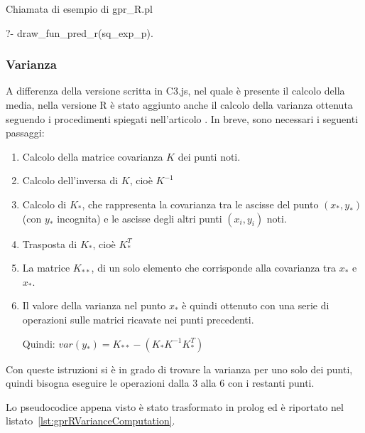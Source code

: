 \documentclass[10pt,titlepage,twoside,a4paper]{report}
\newenvironment{code}{\singlespacing\captionsetup{type=listing}}{}
\begin{document}
\begin{code}
\caption{Chiamata di esempio di gpr\_R.pl}
\label{lst:gprRExample}
\begin{prologcode*}{}
?- draw_fun_pred_r(sq_exp_p).
\end{prologcode*}
\end{code}

\subsubsection{Varianza}
A differenza della versione scritta in C3.js, nel quale è presente il 
calcolo della media, nella versione R è stato aggiunto 
anche il calcolo della varianza ottenuta seguendo i procedimenti spiegati 
nell'articolo  \cite{gpr}. In breve, sono necessari i seguenti 
passaggi:

\begin{enumerate}
\item Calcolo della matrice covarianza $K$ dei punti noti.

\item Calcolo dell'inversa di $K$, cioè $K^{-1}$

\item Calcolo di $K_{\ast}$, che rappresenta la covarianza tra
le ascisse del punto $(x_{\ast},y_{\ast})$ (con $y_{\ast}$ incognita) e le 
ascisse degli altri punti $(x_{i},y_{i})$ noti.

\item Trasposta di $K_{\ast}$, cioè $K_{\ast}^T$

\item La matrice $K_{\ast\ast}$, di un solo elemento che 
corrisponde alla covarianza tra $x_{\ast}$ e $x_{\ast}$.

\item Il valore della varianza nel punto $x_{\ast}$ è quindi ottenuto 
con una serie di operazioni sulle matrici ricavate nei punti precedenti. 

Quindi: $var(y_{\ast}) = K_{\ast\ast} - (K_{\ast} K^{-1} K_{\ast}^T)$
\end{enumerate}

Con queste istruzioni si è in grado di trovare la varianza per uno 
solo dei punti, quindi bisogna eseguire le operazioni dalla 3 
alla 6 con i restanti punti.

Lo pseudocodice appena visto è stato trasformato in prolog ed è riportato nel 
listato~\ref{lst:gprRVarianceComputation}.
\end{document}
